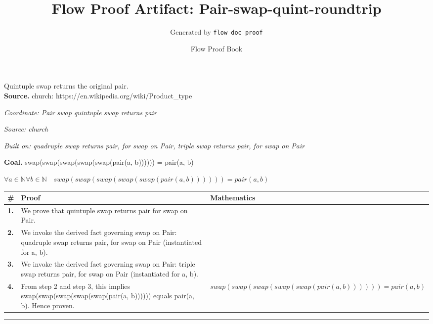 \documentclass[11pt]{article}
\title{Flow Proof Artifact: Pair-swap-quint-roundtrip}
\author{Generated by \texttt{flow doc proof}}
\date{Flow Proof Book}
\theoremstyle{definition}
\begin{document}
\maketitle
Quintuple swap returns the original pair.\\[0.5em]
\textbf{Source.} church: https://en.wikipedia.org/wiki/Product\_type\\[0.5em]
\bigskip
{}\par
\smallskip\noindent\textit{Coordinate: Pair \cdot swap \cdot quintuple swap returns pair}\par
\smallskip\noindent\textit{Source: church}\par
\smallskip\noindent\textit{Built on: quadruple swap returns pair, for swap on Pair, triple swap returns pair, for swap on Pair}\par
\medskip
\noindent\textbf{Goal.} swap(swap(swap(swap(swap(pair(a, b)))))) = pair(a, b)\par
\noindent$\displaystyle \forall a \in \mathbb{N} \forall b \in \mathbb{N}\quad swap(swap(swap(swap(swap(pair(a, b)))))) = pair(a, b)$\par
\medskip
\noindent
\begin{tabular}{@{} >{\raggedright\arraybackslash}p{} >{\raggedright\arraybackslash}p{} >{\raggedleft\arraybackslash}p{} @{}}
\textbf{\#} & \textbf{Proof} & \textbf{Mathematics} \\
\midrule
\textbf{1.} & We prove that quintuple swap returns pair for swap on Pair. & \\[0.45em]
\textbf{2.} & We invoke the derived fact governing swap on Pair: quadruple swap returns pair, for swap on Pair (instantiated for a, b). & \\[0.45em]
\textbf{3.} & We invoke the derived fact governing swap on Pair: triple swap returns pair, for swap on Pair (instantiated for a, b). & \\[0.45em]
\textbf{4.} & From step 2 and step 3, this implies swap(swap(swap(swap(swap(pair(a, b)))))) equals pair(a, b). Hence proven. & $\displaystyle swap(swap(swap(swap(swap(pair(a, b)))))) = pair(a, b)$ \\[0.45em]
\bottomrule
\end{tabular}
\label{thm:Pair-swap-quintuple_swap_returns_pair}
\par\medskip\hrule
\end{document}
